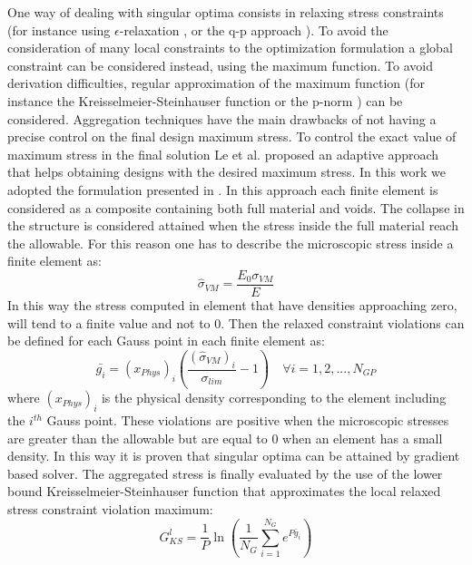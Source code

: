One way of dealing with singular optima consists in relaxing stress constraints (for instance using $\epsilon$-relaxation \cite{cheng1997varepsilon}, or the q-p approach \cite{bruggi2008alternative}). To avoid the consideration of many local constraints to the optimization formulation a global constraint can be considered instead, using the maximum function.  To avoid derivation difficulties, regular approximation of the maximum function (for instance the Kreisselmeier-Steinhauser
function \cite{kreisselmeier1980systematic,yang1996stress} or the p-norm \cite{duysinx1998new} ) can be considered. Aggregation techniques have the main drawbacks of not having a precise control on the final design maximum stress. To control the exact value of maximum stress in the final solution Le et al. \cite{le2010stress} proposed an adaptive approach that helps obtaining designs with the desired maximum stress.  In this work we adopted the formulation presented in \cite{verbart2017unified}.
In this approach each finite element is considered as a composite containing both full material and voids. The collapse in the structure is considered attained when the stress inside the full material reach the allowable. For this reason one has to describe the microscopic stress inside a finite element as:
\begin{equation}
\hat{\sigma}_{VM}=\frac{E_0\sigma_{VM}}{E}
\end{equation}
In this way the stress computed in element that have densities approaching zero, will tend to a finite value and not to 0. Then the relaxed constraint violations can be defined for each Gauss point in each finite element as:
\begin{equation}
\label{eq.2.30}
\bar{g_i}=(x_{Phys})_i\left(\frac{(\hat{\sigma}_{VM})_i}{\sigma_{lim}}-1\right) \quad \forall i=1,2,...,N_{GP}
\end{equation}
where $(x_{Phys})_i$ is the physical density corresponding to the element including the $i^{th}$ Gauss point.
These violations are positive when the microscopic stresses are greater than the allowable but are equal to 0 when an element has a small density. In this way it is proven that singular optima can be attained by gradient based solver.
The aggregated stress is finally evaluated by the use of the lower bound Kreisselmeier-Steinhauser
function \cite{kreisselmeier1980systematic} that approximates the local relaxed stress constraint violation maximum:
\begin{equation}
\label{e.KSl}
G^{l}_{KS}=\frac{1}{P}\ln\left(\frac{1}{N_G}\sum_{i=1}^{N_G}e^{P\bar{g}_i}\right)
\end{equation}
